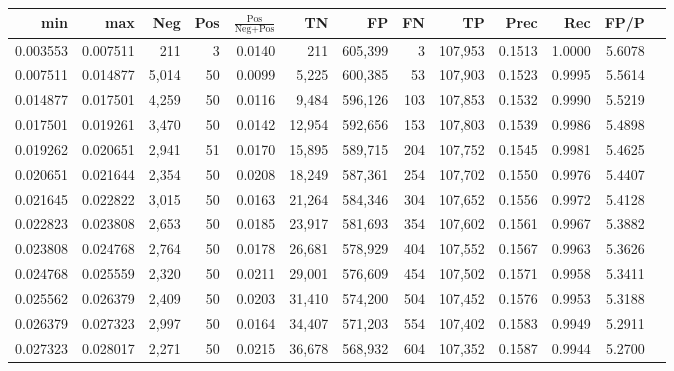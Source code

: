 \begin{tabular}{rrrrrrrrrrrrr}
\toprule
     min &      max &   Neg & Pos & $\frac{\text{Pos}}{\text{Neg}+\text{Pos}}$ &      TN &      FP &      FN &      TP &   Prec &    Rec &   FP/P \\
\midrule
0.003553 & 0.007511 &   211 &   3 &                                     0.0140 &     211 & 605,399 &       3 & 107,953 & 0.1513 & 1.0000 & 5.6078 \\
0.007511 & 0.014877 & 5,014 &  50 &                                     0.0099 &   5,225 & 600,385 &      53 & 107,903 & 0.1523 & 0.9995 & 5.5614 \\
0.014877 & 0.017501 & 4,259 &  50 &                                     0.0116 &   9,484 & 596,126 &     103 & 107,853 & 0.1532 & 0.9990 & 5.5219 \\
0.017501 & 0.019261 & 3,470 &  50 &                                     0.0142 &  12,954 & 592,656 &     153 & 107,803 & 0.1539 & 0.9986 & 5.4898 \\
0.019262 & 0.020651 & 2,941 &  51 &                                     0.0170 &  15,895 & 589,715 &     204 & 107,752 & 0.1545 & 0.9981 & 5.4625 \\
0.020651 & 0.021644 & 2,354 &  50 &                                     0.0208 &  18,249 & 587,361 &     254 & 107,702 & 0.1550 & 0.9976 & 5.4407 \\
0.021645 & 0.022822 & 3,015 &  50 &                                     0.0163 &  21,264 & 584,346 &     304 & 107,652 & 0.1556 & 0.9972 & 5.4128 \\
0.022823 & 0.023808 & 2,653 &  50 &                                     0.0185 &  23,917 & 581,693 &     354 & 107,602 & 0.1561 & 0.9967 & 5.3882 \\
0.023808 & 0.024768 & 2,764 &  50 &                                     0.0178 &  26,681 & 578,929 &     404 & 107,552 & 0.1567 & 0.9963 & 5.3626 \\
0.024768 & 0.025559 & 2,320 &  50 &                                     0.0211 &  29,001 & 576,609 &     454 & 107,502 & 0.1571 & 0.9958 & 5.3411 \\
0.025562 & 0.026379 & 2,409 &  50 &                                     0.0203 &  31,410 & 574,200 &     504 & 107,452 & 0.1576 & 0.9953 & 5.3188 \\
0.026379 & 0.027323 & 2,997 &  50 &                                     0.0164 &  34,407 & 571,203 &     554 & 107,402 & 0.1583 & 0.9949 & 5.2911 \\
0.027323 & 0.028017 & 2,271 &  50 &                                     0.0215 &  36,678 & 568,932 &     604 & 107,352 & 0.1587 & 0.9944 & 5.2700 \\

\end{tabular}
